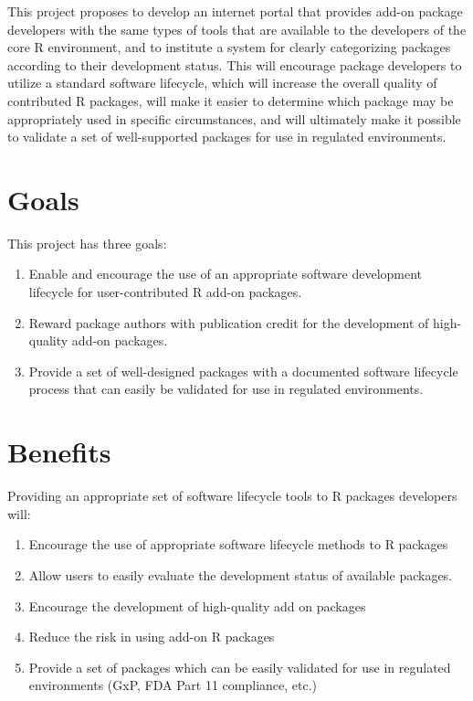 \documentclass[12pt]{article}
\begin{document}
This project proposes to develop an internet portal that provides
add-on package developers with the same types of tools that are
available to the developers of the core R environment, and to
institute a system for clearly categorizing packages according to
their development status.  This will encourage package developers to
utilize a standard software lifecycle, which will increase the overall
quality of contributed R packages, will make it easier to determine
which package may be appropriately used in specific circumstances, and
will ultimately make it possible to validate a set of well-supported
packages for use in regulated environments.


\section{Goals}

This project has three goals:

\begin{enumerate}
\item Enable and encourage the use of an appropriate software
  development lifecycle for user-contributed R add-on packages.

\item Reward package authors with publication credit for the
  development of high-quality add-on packages.

\item Provide a set of well-designed packages with a documented
  software lifecycle process that can easily be validated for use in
  regulated environments.

\end{enumerate}

\section{Benefits}

Providing an appropriate set of software lifecycle tools to R packages
developers will:
\begin{enumerate}
\item Encourage the use of appropriate software lifecycle methods to R
  packages
\item Allow users to easily evaluate the development status of
  available packages.
\item Encourage the development of high-quality add on packages
\item Reduce the risk in using add-on R packages
\item Provide a set of packages which can be easily validated for use
  in regulated environments (GxP, FDA Part 11 compliance, etc.)
\end{enumerate}
\end{document}
